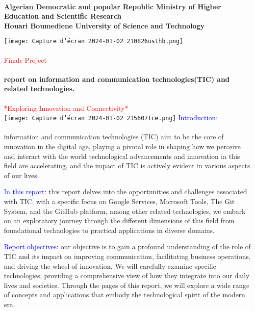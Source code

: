 \documentclass[a4paper,11pt]{report}
\begin{document}
\clearpage

\paragraph{}
\Large
\textbf{Algerian Democratic and popular Republic Ministry of Higher Education and Scientific Research}\\
\textbf{Houari Boumediene University of Science and Technology}


\texttt{[image: Capture d’écran 2024-01-02 210826usthb.png]}
\paragraph{}
\Huge
\textcolor{red}{Finale Project}
\paragraph{}
\Large
\textbf{report on information and communication technologies(TIC) and related technologies.}
\paragraph{}
\textcolor{red}{*Exploring Innovation and Connectivity*}\\

\texttt{[image: Capture d’écran 2024-01-02 215607tce.png]}
\clearpage
\Huge
\textcolor{blue}{Introduction:}
\paragraph{}
\Large
information and communication technologies (TIC) aim to be the core of innovation in the digital age, playing a pivotal role in shaping how we perceive and interact with the world technological advancements and innovation in this field are accelerating, and the impact of TIC is actively evident in various aspects of our lives.

\textcolor{blue}{In this report:} this report delves into the opportunities and challenges associated with TIC, with a specific focus on Google Services, Microsoft Tools, The Git System, and the GitHub platform, among other related technologies, we embark on an exploratory journey through the different dimensions of this field from foundational technologies to practical applications in diverse domains.

\textcolor{blue}{Report objectives:} our objective is to gain a profound understanding of the role of TIC and its impact on improving communication, facilitating business operations, and driving the wheel of innovation. We will carefully examine specific technologies, providing a comprehensive view of how they integrate into our daily lives and societies.
Through the pages of this report, we will explore a wide range of concepts and applications that embody the technological spirit of the modern era.\\
\end{document}
